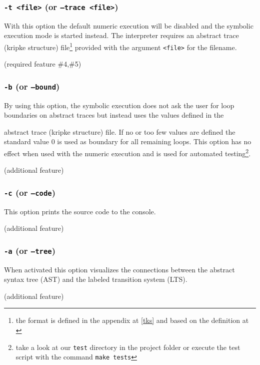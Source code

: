 \documentclass[english,a4paper,oneside]{article}%
\begin{document}
\subsubsection{\texttt{-t <file>} (or \texttt{--trace <file>})}
		With this option the default numeric execution will be disabled and the symbolic execution mode is started instead. The interpreter requires an abstract trace (kripke structure) file\footnote{the format is defined in the appendix at \ref{tks} and based on the definition at \cite[p.~10]{cav}} provided with the argument \texttt{<file>} for the filename.
		\begin{flushright}\footnotesize{(required feature \#4,\#5)}\end{flushright}
		
\subsubsection{\texttt{-b} (or \texttt{--bound})}
		By using this option, the symbolic execution does not ask the user for loop boundaries on abstract traces but instead uses the values defined in the 
		
%
abstract trace (kripke structure) file. If no or too few values are defined the standard value $0$ is used as boundary for all remaining loops. This option has no effect when used with the numeric execution and is used for automated testing\footnote{take a look at our \texttt{test} directory in the project folder or execute the test script with the command \texttt{make tests}}.
		\begin{flushright}\footnotesize{(additional feature)}\end{flushright}
		
\subsubsection{\texttt{-c} (or \texttt{--code})}
		This option prints the source code to the console.
		\begin{flushright}\footnotesize{(additional feature)}\end{flushright}
		
\subsubsection{\texttt{-a} (or \texttt{--tree})}
		When activated this option visualizes the connections between the abstract syntax tree (AST) and the labeled transition system (LTS).
		\begin{flushright}\footnotesize{(additional feature)}\end{flushright}
		
\end{document}
